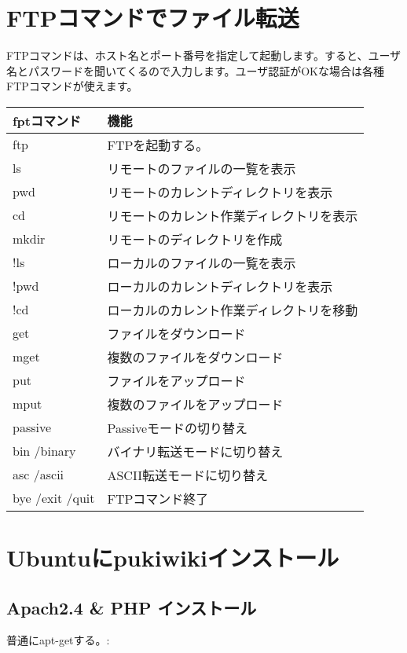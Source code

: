 \documentclass[letterpaper,10pt,dvipdfmx]{sphinxmanual}
\begin{document}
\section{FTPコマンドでファイル転送}
\label{learned_linux_server:ftp}
FTPコマンドは、ホスト名とポート番号を指定して起動します。すると、ユーザ名とパスワードを聞いてくるので入力します。ユーザ認証がOKな場合は各種FTPコマンドが使えます。

\noindent\begin{tabulary}{\linewidth}{|L|L|}
\hline
\textsf{\relax 
fptコマンド
\unskip}\relax &\textsf{\relax 
機能
\unskip}\relax \\
\hline
ftp
&
FTPを起動する。
\\
\hline
ls
&
リモートのファイルの一覧を表示
\\
\hline
pwd
&
リモートのカレントディレクトリを表示
\\
\hline
cd
&
リモートのカレント作業ディレクトリを表示
\\
\hline
mkdir
&
リモートのディレクトリを作成
\\
\hline
!ls
&
ローカルのファイルの一覧を表示
\\
\hline
!pwd
&
ローカルのカレントディレクトリを表示
\\
\hline
!cd
&
ローカルのカレント作業ディレクトリを移動
\\
\hline
get
&
ファイルをダウンロード
\\
\hline
mget
&
複数のファイルをダウンロード
\\
\hline
put
&
ファイルをアップロード
\\
\hline
mput
&
複数のファイルをアップロード
\\
\hline
passive
&
Passiveモードの切り替え
\\
\hline
bin /binary
&
バイナリ転送モードに切り替え
\\
\hline
asc /ascii
&
ASCII転送モードに切り替え
\\
\hline
bye /exit /quit
&
FTPコマンド終了
\\
\hline\end{tabulary}



\section{Ubuntuにpukiwikiインストール}
\label{learned_linux_server:ubuntupukiwiki}

\subsection{Apach2.4 \& PHP インストール}
\label{learned_linux_server:apach2-4-php}
普通にapt-getする。:
\end{document}
